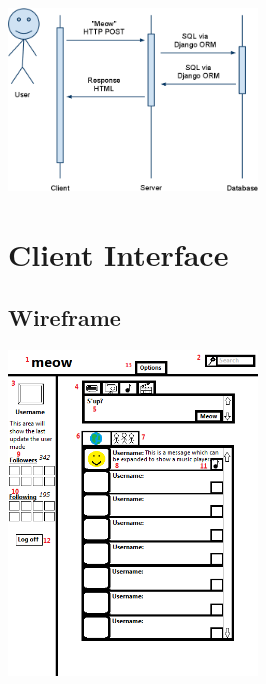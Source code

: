 \documentclass{sig-alt-release2}
\begin{document}
\includegraphics[width=250px]{images/sequence.png}

\section{Client Interface}

\subsection{Wireframe}

\includegraphics[width=250px]{images/wireframe.png}
\end{document}
